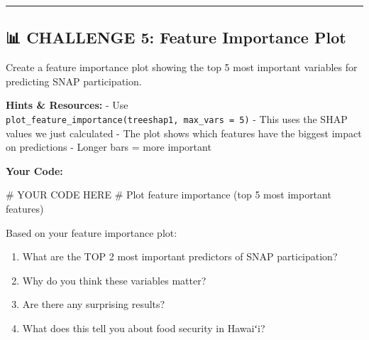 \documentclass[
  letterpaper,
  DIV=11,
  numbers=noendperiod]{scrartcl}
\newenvironment{Shaded}{\begin{snugshade}}{\end{snugshade}}
\newcommand{\CommentTok}[1]{\textcolor[rgb]{0.37,0.37,0.37}{#1}}
\providecommand{\tightlist}{%
  \setlength{\itemsep}{0pt}\setlength{\parskip}{0pt}}\usepackage{longtable,booktabs,array}
\begin{document}
\begin{center}\rule{0.5\linewidth}{0.5pt}\end{center}

\subsection{📊 CHALLENGE 5: Feature Importance
Plot}\label{challenge-5-feature-importance-plot}

\begin{tcolorbox}[enhanced jigsaw, title=\textcolor{quarto-callout-warning-color}{\faExclamationTriangle}\hspace{0.5em}{Your Task}, titlerule=0mm, coltitle=black, colbacktitle=quarto-callout-warning-color!10!white, colback=white, left=2mm, toprule=.15mm, opacitybacktitle=0.6, toptitle=1mm, colframe=quarto-callout-warning-color-frame, bottomtitle=1mm, arc=.35mm, bottomrule=.15mm, breakable, leftrule=.75mm, opacityback=0, rightrule=.15mm]

Create a feature importance plot showing the top 5 most important
variables for predicting SNAP participation.

\textbf{Hints \& Resources:} - Use
\texttt{plot\_feature\_importance(treeshap1,\ max\_vars\ =\ 5)} - This
uses the SHAP values we just calculated - The plot shows which features
have the biggest impact on predictions - Longer bars = more important

\textbf{Your Code:}

\end{tcolorbox}

\begin{Shaded}
\begin{Highlighting}[]
\CommentTok{\# YOUR CODE HERE}
\CommentTok{\# Plot feature importance (top 5 most important features)}
\end{Highlighting}
\end{Shaded}

\begin{tcolorbox}[enhanced jigsaw, title=\textcolor{quarto-callout-note-color}{\faInfo}\hspace{0.5em}{💭 Interpretation}, titlerule=0mm, coltitle=black, colbacktitle=quarto-callout-note-color!10!white, colback=white, left=2mm, toprule=.15mm, opacitybacktitle=0.6, toptitle=1mm, colframe=quarto-callout-note-color-frame, bottomtitle=1mm, arc=.35mm, bottomrule=.15mm, breakable, leftrule=.75mm, opacityback=0, rightrule=.15mm]

Based on your feature importance plot:

\begin{enumerate}
\def\labelenumi{\arabic{enumi}.}
\tightlist
\item
  What are the TOP 2 most important predictors of SNAP participation?
\item
  Why do you think these variables matter?
\item
  Are there any surprising results?
\item
  What does this tell you about food security in Hawaiʻi?
\end{enumerate}

\end{tcolorbox}
\end{document}
